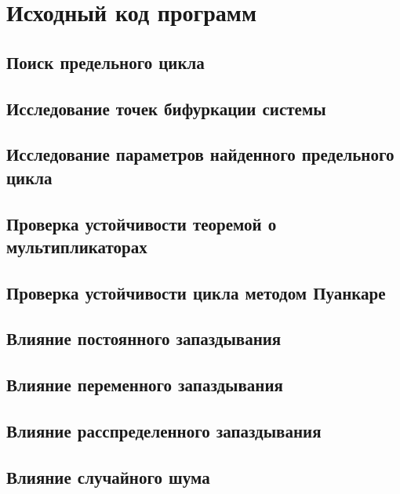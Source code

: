 \chapter{Исходный код программ}
\label{appendix:src}

\section{Поиск предельного цикла}

\clearpage

\section{Исследование точек бифуркации системы}

\clearpage

\section{Исследование параметров найденного предельного цикла}

\clearpage

\section{Проверка устойчивости теоремой о мультипликаторах}

\clearpage

\section{Проверка устойчивости цикла методом Пуанкаре}

\clearpage

\section{Влияние постоянного запаздывания}

\clearpage

\section{Влияние переменного запаздывания}

\clearpage

\section{Влияние расспределенного запаздывания}

\clearpage

\section{Влияние случайного шума}

\clearpage

